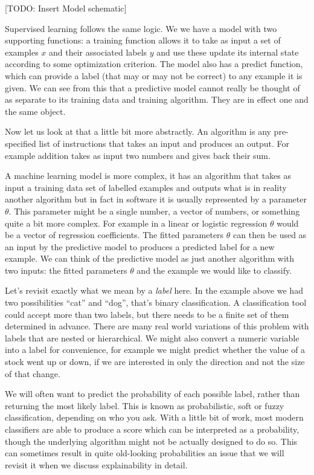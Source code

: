 \documentclass[
]{book}
\theoremstyle{definition}
\theoremstyle{definition}
\theoremstyle{definition}
\theoremstyle{definition}
\theoremstyle{remark}
\begin{document}
{[}TODO: Insert Model schematic{]}

Supervised learning follows the same logic. We we have a model with two supporting functions: a training function allows it to take as input a set of examples \(x\) and their associated labels \(y\) and use these update its internal state according to some optimization criterion. The model also has a predict function, which can provide a label (that may or may not be correct) to any example it is given. We can see from this that a predictive model cannot really be thought of as separate to its training data and training algorithm. They are in effect one and the same object.

Now let us look at that a little bit more abstractly. An algorithm is any pre-specified list of instructions that takes an input and produces an output. For example addition takes as input two numbers and gives back their sum.

A machine learning model is more complex, it has an algorithm that takes as input a training data set of labelled examples and outputs what is in reality another algorithm but in fact in software it is usually represented by a parameter \(\theta\). This parameter might be a single number, a vector of numbers, or something quite a bit more complex. For example in a linear or logistic regression \(\theta\) would be a vector of regression coefficients. The fitted parameters \(\theta\) can then be used as an input by the predictive model to produces a predicted label for a new example. We can think of the predictive model as just another algorithm with two inputs: the fitted parameters \(\theta\) and the example we would like to classify.

Let's revisit exactly what we mean by a \emph{label} here. In the example above we had two possibilities ``cat'' and ``dog'', that's binary classification. A classification tool could accept more than two labels, but there needs to be a finite set of them determined in advance. There are many real world variations of this problem with labels that are nested or hierarchical. We might also convert a numeric variable into a label for convenience, for example we might predict whether the value of a stock went up or down, if we are interested in only the direction and not the size of that change.

We will often want to predict the probability of each possible label, rather than returning the most likely label. This is known as probabilistic, soft or fuzzy classification, depending on who you ask. With a little bit of work, most modern classifiers are able to produce a score which can be interpreted as a probability, though the underlying algorithm might not be actually designed to do so. This can sometimes result in quite old-looking probabilities an issue that we will revisit it when we discuss explainability in detail.
\end{document}
